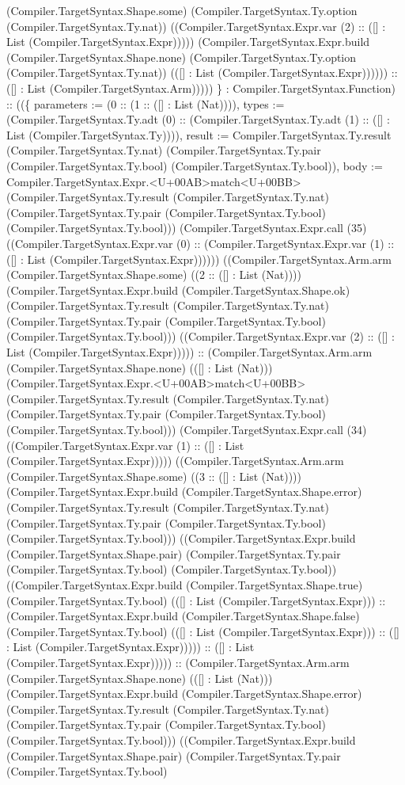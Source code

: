 \documentclass[11pt]{article}
\begin{document}
(Compiler.TargetSyntax.Shape.some) (Compiler.TargetSyntax.Ty.option (Compiler.TargetSyntax.Ty.nat)) ((Compiler.TargetSyntax.Expr.var (2) :: ([] : List (Compiler.TargetSyntax.Expr))))) (Compiler.TargetSyntax.Expr.build (Compiler.TargetSyntax.Shape.none) (Compiler.TargetSyntax.Ty.option (Compiler.TargetSyntax.Ty.nat)) (([] : List (Compiler.TargetSyntax.Expr)))))) :: ([] : List (Compiler.TargetSyntax.Arm))))) \} : Compiler.TargetSyntax.Function) :: ((\{ parameters := (0 :: (1 :: ([] : List (Nat)))), types := (Compiler.TargetSyntax.Ty.adt (0) :: (Compiler.TargetSyntax.Ty.adt (1) :: ([] : List (Compiler.TargetSyntax.Ty)))), result := Compiler.TargetSyntax.Ty.result (Compiler.TargetSyntax.Ty.nat) (Compiler.TargetSyntax.Ty.pair (Compiler.TargetSyntax.Ty.bool) (Compiler.TargetSyntax.Ty.bool)), body := Compiler.TargetSyntax.Expr.<U+00AB>match<U+00BB> (Compiler.TargetSyntax.Ty.result (Compiler.TargetSyntax.Ty.nat) (Compiler.TargetSyntax.Ty.pair (Compiler.TargetSyntax.Ty.bool) (Compiler.TargetSyntax.Ty.bool))) (Compiler.TargetSyntax.Expr.call (35) ((Compiler.TargetSyntax.Expr.var (0) :: (Compiler.TargetSyntax.Expr.var (1) :: ([] : List (Compiler.TargetSyntax.Expr)))))) ((Compiler.TargetSyntax.Arm.arm (Compiler.TargetSyntax.Shape.some) ((2 :: ([] : List (Nat)))) (Compiler.TargetSyntax.Expr.build (Compiler.TargetSyntax.Shape.ok) (Compiler.TargetSyntax.Ty.result (Compiler.TargetSyntax.Ty.nat) (Compiler.TargetSyntax.Ty.pair (Compiler.TargetSyntax.Ty.bool) (Compiler.TargetSyntax.Ty.bool))) ((Compiler.TargetSyntax.Expr.var (2) :: ([] : List (Compiler.TargetSyntax.Expr))))) :: (Compiler.TargetSyntax.Arm.arm (Compiler.TargetSyntax.Shape.none) (([] : List (Nat))) (Compiler.TargetSyntax.Expr.<U+00AB>match<U+00BB> (Compiler.TargetSyntax.Ty.result (Compiler.TargetSyntax.Ty.nat) (Compiler.TargetSyntax.Ty.pair (Compiler.TargetSyntax.Ty.bool) (Compiler.TargetSyntax.Ty.bool))) (Compiler.TargetSyntax.Expr.call (34) ((Compiler.TargetSyntax.Expr.var (1) :: ([] : List (Compiler.TargetSyntax.Expr))))) ((Compiler.TargetSyntax.Arm.arm (Compiler.TargetSyntax.Shape.some) ((3 :: ([] : List (Nat)))) (Compiler.TargetSyntax.Expr.build (Compiler.TargetSyntax.Shape.error) (Compiler.TargetSyntax.Ty.result (Compiler.TargetSyntax.Ty.nat) (Compiler.TargetSyntax.Ty.pair (Compiler.TargetSyntax.Ty.bool) (Compiler.TargetSyntax.Ty.bool))) ((Compiler.TargetSyntax.Expr.build (Compiler.TargetSyntax.Shape.pair) (Compiler.TargetSyntax.Ty.pair (Compiler.TargetSyntax.Ty.bool) (Compiler.TargetSyntax.Ty.bool)) ((Compiler.TargetSyntax.Expr.build (Compiler.TargetSyntax.Shape.true) (Compiler.TargetSyntax.Ty.bool) (([] : List (Compiler.TargetSyntax.Expr))) :: (Compiler.TargetSyntax.Expr.build (Compiler.TargetSyntax.Shape.false) (Compiler.TargetSyntax.Ty.bool) (([] : List (Compiler.TargetSyntax.Expr))) :: ([] : List (Compiler.TargetSyntax.Expr))))) :: ([] : List (Compiler.TargetSyntax.Expr))))) :: (Compiler.TargetSyntax.Arm.arm (Compiler.TargetSyntax.Shape.none) (([] : List (Nat))) (Compiler.TargetSyntax.Expr.build (Compiler.TargetSyntax.Shape.error) (Compiler.TargetSyntax.Ty.result (Compiler.TargetSyntax.Ty.nat) (Compiler.TargetSyntax.Ty.pair (Compiler.TargetSyntax.Ty.bool) (Compiler.TargetSyntax.Ty.bool))) ((Compiler.TargetSyntax.Expr.build (Compiler.TargetSyntax.Shape.pair) (Compiler.TargetSyntax.Ty.pair (Compiler.TargetSyntax.Ty.bool) 
\end{document}
